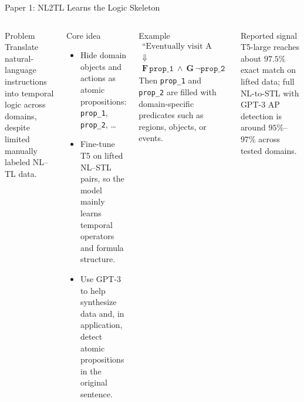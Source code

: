 \documentclass[aspectratio=169]{beamer}
\newcommand{\stlG}{\mathbf{G}}
\newcommand{\stlF}{\mathbf{F}}
\begin{document}
\begin{frame}{Paper 1: NL2TL Learns the Logic Skeleton}
\begin{columns}[T]
\begin{block}{Problem}
\small
Translate natural-language instructions into temporal logic across domains, despite limited manually labeled NL--TL data.
\end{block}

\begin{block}{Core idea}
\small
\begin{itemize}
  \item Hide domain objects and actions as atomic propositions: \texttt{prop\_1}, \texttt{prop\_2}, \ldots
  \item Fine-tune T5 on lifted NL--STL pairs, so the model mainly learns temporal operators and formula structure.
  \item Use GPT-3 to help synthesize data and, in application, detect atomic propositions in the original sentence.
\end{itemize}
\end{block}

\begin{block}{Example}
\small
\[
\begin{array}{c}
\text{``Eventually visit A and always avoid B.''}\\[0.3em]
\Downarrow\\[0.3em]
\stlF\, \texttt{prop\_1}\ \wedge\ \stlG\, \neg\texttt{prop\_2}
\end{array}
\]
\vspace{-0.3em}
\small
Then \texttt{prop\_1} and \texttt{prop\_2} are filled with domain-specific predicates such as regions, objects, or events.
\end{block}

\begin{block}{Reported signal}
\footnotesize
T5-large reaches about \(97.5\%\) exact match on lifted data; full NL-to-STL with GPT-3 AP detection is around \(95\%\)--\(97\%\) across tested domains.
\end{block}
\end{columns}
\end{frame}
\end{document}

